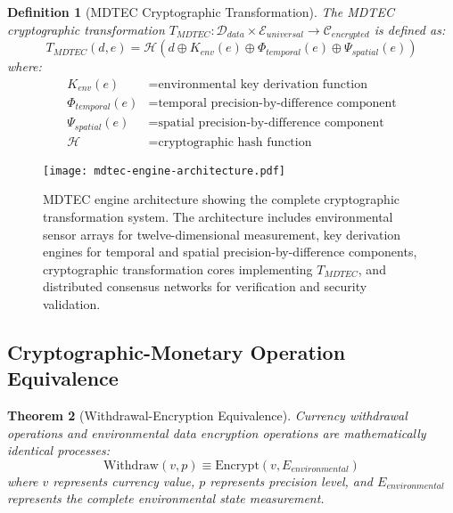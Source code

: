 \documentclass[12pt,a4paper]{article}
\newtheorem{theorem}{Theorem}
\newtheorem{definition}[theorem]{Definition}
\begin{document}
\begin{definition}[MDTEC Cryptographic Transformation]
The MDTEC cryptographic transformation $T_{MDTEC}: \mathcal{D}_{data} \times \mathcal{E}_{universal} \to \mathcal{C}_{encrypted}$ is defined as:
\begin{equation}
T_{MDTEC}(d, e) = \mathcal{H}(d \oplus K_{env}(e) \oplus \Phi_{temporal}(e) \oplus \Psi_{spatial}(e))
\end{equation}
where:
\begin{align}
K_{env}(e) &= \text{environmental key derivation function} \\
\Phi_{temporal}(e) &= \text{temporal precision-by-difference component} \\
\Psi_{spatial}(e) &= \text{spatial precision-by-difference component} \\
\mathcal{H} &= \text{cryptographic hash function}
\end{align}
\end{definition}

\begin{figure}[H]
\centering
\texttt{[image: mdtec-engine-architecture.pdf]}
\caption{MDTEC engine architecture showing the complete cryptographic transformation system. The architecture includes environmental sensor arrays for twelve-dimensional measurement, key derivation engines for temporal and spatial precision-by-difference components, cryptographic transformation cores implementing $T_{MDTEC}$, and distributed consensus networks for verification and security validation.}
\label{fig:mdtec_engine_architecture}
\end{figure}

\subsection{Cryptographic-Monetary Operation Equivalence}

\begin{theorem}[Withdrawal-Encryption Equivalence]
Currency withdrawal operations and environmental data encryption operations are mathematically identical processes:
\begin{equation}
\text{Withdraw}(v, p) \equiv \text{Encrypt}(v, E_{environmental})
\end{equation}
where $v$ represents currency value, $p$ represents precision level, and $E_{environmental}$ represents the complete environmental state measurement.
\end{theorem}
\end{document}
